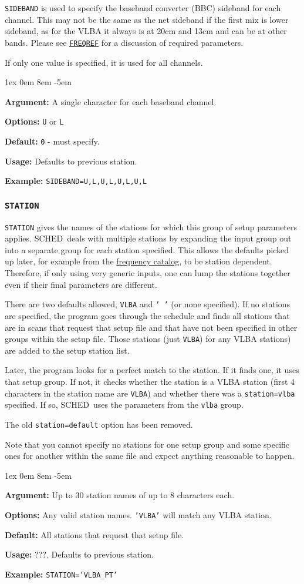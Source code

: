 \documentclass{report}
\newcommand{\schedb}{{\sc SCHED~}}
\newcommand{\rcwbox}[5]{
  \begin{list}{}{\parsep 1ex  \itemsep 0em
                 \leftmargin 8em  \itemindent -5em }
    \item {\bf Argument:} #1
    \item {\bf Options:}  #2
    \item {\bf Default:}  #3
    \item {\bf Usage:}    #4
    \item {\bf Example:}  #5
  \end{list}
}
\begin{document}
{\tt SIDEBAND} is used to specify the baseband converter (BBC)
sideband for each channel.  This may not be the same as the net
sideband if the first mix is lower sideband, as for the VLBA it always
is at 20cm and 13cm and can be at other bands. Please see
{\hyperref[SP:FREQREF]{{\tt FREQREF}}} for a discussion of required
parameters.

If only one value is specified, it is used for all channels.

\rcwbox
{A single character for each baseband channel.}
{{\tt U} or {\tt L}}
{{\tt 0} - must specify.}
{Defaults to previous station.}
{{\tt SIDEBAND=U,L,U,L,U,L,U,L}}


\subsubsection{\label{SP:STATION}{\tt STATION}}

{\tt STATION} gives the names of the stations for which this group of
setup parameters applies.  \schedb deals with multiple stations by
expanding the input group out into a separate group for each
station specified.  This allows the defaults picked up later, for
example from the 
{\hyperref[SEC:FRQCAT]{frequency catalog}}, to be station
dependent.  Therefore, if only using very generic inputs, one can
lump the stations together even if their final parameters are
different.

There are two defaults allowed, {\tt VLBA} and {\tt ' '} (or none
specified).  If no stations are specified, the program goes through
the schedule and finds all stations that are in scans that request
that setup file and that have not been specified in other groups
within the setup file.  Those stations (just {\tt VLBA}) for any VLBA
stations) are added to the setup station list.

Later, the program looks for a perfect match to the station.  If it
finds one, it uses that setup group.  If not, it checks whether the
station is a VLBA station (first 4 characters in the station name are
{\tt VLBA}) and whether there was a {\tt station=vlba} specified.  If
so, \schedb uses the parameters from the {\tt vlba} group.

The old {\tt station=default} option has been removed.

Note that you cannot specify no stations for one setup group and some
specific ones for another within the same file and expect anything
reasonable to happen.

\rcwbox
{Up to 30 station names of up to 8 characters each.}
{Any valid station names. {\tt 'VLBA'} will match any VLBA station.}
{All stations that request that setup file.}
{???. Defaults to previous station.}
{{\tt STATION='VLBA\_PT'}}
\end{document}

